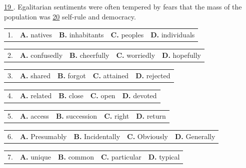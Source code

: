 \documentclass[UTF8,11pt]{ctexart}
\begin{document}
\uline{19 }. Egalitarian sentiments were often tempered by fears that the mass of the population was \uline{20} self-rule and democracy.


\noindent\begin{tabularx}{\linewidth}{@{}lXXXX@{}}1. & \textbf{A.} natives & \textbf{B.} inhabitants & \textbf{C.} peoples & \textbf{D.} individuals\\\end{tabularx}\par

\noindent\begin{tabularx}{\linewidth}{@{}lXXXX@{}}2. & \textbf{A.} confusedly & \textbf{B.} cheerfully & \textbf{C.} worriedly & \textbf{D.} hopefully\\\end{tabularx}\par

\noindent\begin{tabularx}{\linewidth}{@{}lXXXX@{}}3. & \textbf{A.} shared & \textbf{B.} forgot & \textbf{C.} attained & \textbf{D.} rejected\\\end{tabularx}\par

\noindent\begin{tabularx}{\linewidth}{@{}lXXXX@{}}4. & \textbf{A.} related & \textbf{B.} close & \textbf{C.} open & \textbf{D.} devoted\\\end{tabularx}\par

\noindent\begin{tabularx}{\linewidth}{@{}lXXXX@{}}5. & \textbf{A.} access & \textbf{B.} succession & \textbf{C.} right & \textbf{D.} return\\\end{tabularx}\par

\noindent\begin{tabularx}{\linewidth}{@{}lXXXX@{}}6. & \textbf{A.} Presumably & \textbf{B.} Incidentally & \textbf{C.} Obviously & \textbf{D.} Generally\\\end{tabularx}\par

\noindent\begin{tabularx}{\linewidth}{@{}lXXXX@{}}7. & \textbf{A.} unique & \textbf{B.} common & \textbf{C.} particular & \textbf{D.} typical\\\end{tabularx}\par
\end{document}
